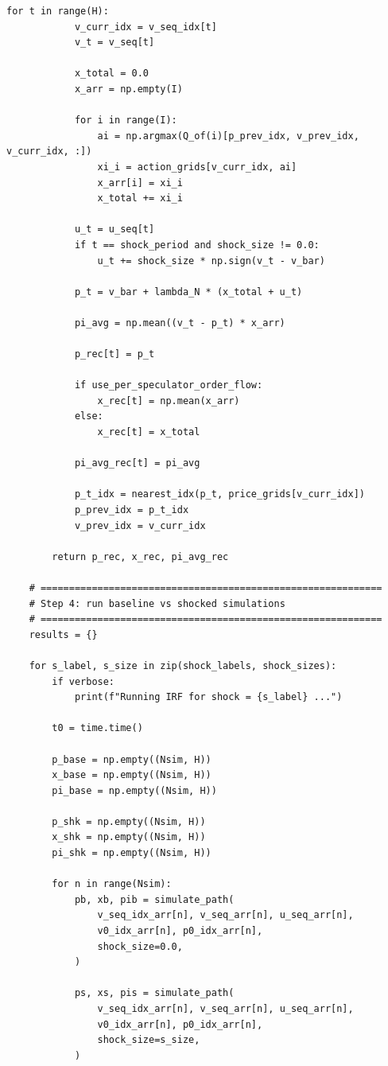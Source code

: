 \begin{lstlisting}[style=pythonstyle]
        for t in range(H):
            v_curr_idx = v_seq_idx[t]
            v_t = v_seq[t]

            x_total = 0.0
            x_arr = np.empty(I)

            for i in range(I):
                ai = np.argmax(Q_of(i)[p_prev_idx, v_prev_idx, v_curr_idx, :])
                xi_i = action_grids[v_curr_idx, ai]
                x_arr[i] = xi_i
                x_total += xi_i

            u_t = u_seq[t]
            if t == shock_period and shock_size != 0.0:
                u_t += shock_size * np.sign(v_t - v_bar)

            p_t = v_bar + lambda_N * (x_total + u_t)

            pi_avg = np.mean((v_t - p_t) * x_arr)

            p_rec[t] = p_t

            if use_per_speculator_order_flow:
                x_rec[t] = np.mean(x_arr)
            else:
                x_rec[t] = x_total

            pi_avg_rec[t] = pi_avg

            p_t_idx = nearest_idx(p_t, price_grids[v_curr_idx])
            p_prev_idx = p_t_idx
            v_prev_idx = v_curr_idx

        return p_rec, x_rec, pi_avg_rec

    # ============================================================
    # Step 4: run baseline vs shocked simulations
    # ============================================================
    results = {}

    for s_label, s_size in zip(shock_labels, shock_sizes):
        if verbose:
            print(f"Running IRF for shock = {s_label} ...")

        t0 = time.time()

        p_base = np.empty((Nsim, H))
        x_base = np.empty((Nsim, H))
        pi_base = np.empty((Nsim, H))

        p_shk = np.empty((Nsim, H))
        x_shk = np.empty((Nsim, H))
        pi_shk = np.empty((Nsim, H))

        for n in range(Nsim):
            pb, xb, pib = simulate_path(
                v_seq_idx_arr[n], v_seq_arr[n], u_seq_arr[n],
                v0_idx_arr[n], p0_idx_arr[n],
                shock_size=0.0,
            )

            ps, xs, pis = simulate_path(
                v_seq_idx_arr[n], v_seq_arr[n], u_seq_arr[n],
                v0_idx_arr[n], p0_idx_arr[n],
                shock_size=s_size,
            )


\end{lstlisting}

